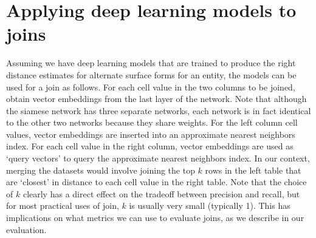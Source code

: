 \section{Applying deep learning models to joins}
\label{join_system}


Assuming we have deep learning models that are trained to produce the
right distance estimates for alternate surface forms for an entity,
the models can be used for a join as follows.  For each cell value in
the two columns to be joined, obtain vector embeddings from the last
layer of the network.  Note that although the siamese network has
three separate networks, each network is in fact identical to the
other two networks because they share weights.  For the left column
cell values, vector embeddings are inserted into an approximate
nearest neighbors index.  For each cell value in the right column,
vector embeddings are used as `query vectors' to query the approximate
nearest neighbors index.  In our context, merging the datasets would
involve joining the top $k$ rows in the left table that are `closest'
in distance to each cell value in the right table.  Note that the
choice of $k$ clearly has a direct effect on the tradeoff between
precision and recall, but for most practical uses of join, $k$ is
usually very small (typically 1).  This has implications on what
metrics we can use to evaluate joins, as we describe in our evaluation.

